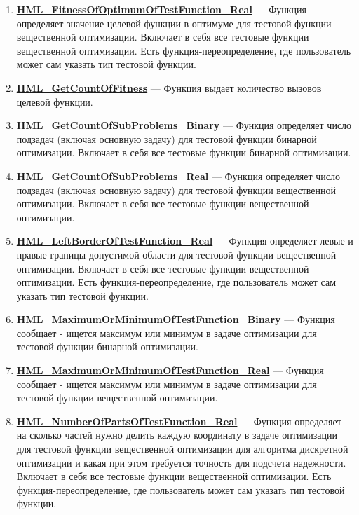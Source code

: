 \documentclass[a4paper,12pt]{article}
\begin{document}
\begin{enumerate}
\item \textbf{\hyperref[HML_FitnessOfOptimumOfTestFunction_Real]{HML\_FitnessOfOptimumOfTestFunction\_Real}} --- Функция определяет значение целевой функции в оптимуме для тестовой функции вещественной оптимизации. Включает в себя все тестовые функции вещественной оптимизации. Есть функция-переопределение, где пользователь может сам указать тип тестовой функции.

\item \textbf{\hyperref[HML_GetCountOfFitness]{HML\_GetCountOfFitness}} --- Функция выдает количество вызовов целевой функции.

\item \textbf{\hyperref[HML_GetCountOfSubProblems_Binary]{HML\_GetCountOfSubProblems\_Binary}} --- Функция определяет число подзадач (включая основную задачу) для тестовой функции бинарной оптимизации. Включает в себя все тестовые функции бинарной оптимизации.

\item \textbf{\hyperref[HML_GetCountOfSubProblems_Real]{HML\_GetCountOfSubProblems\_Real}} --- Функция определяет число подзадач (включая основную задачу) для тестовой функции вещественной оптимизации. Включает в себя все тестовые функции вещественной оптимизации.

\item \textbf{\hyperref[HML_LeftBorderOfTestFunction_Real]{HML\_LeftBorderOfTestFunction\_Real}} --- Функция определяет левые и правые границы допустимой области для тестовой функции вещественной оптимизации. Включает в себя все тестовые функции вещественной оптимизации. Есть функция-переопределение, где пользователь может сам указать тип тестовой функции.

\item \textbf{\hyperref[HML_MaximumOrMinimumOfTestFunction_Binary]{HML\_MaximumOrMinimumOfTestFunction\_Binary}} --- 	Функция сообщает - ищется максимум или минимум в задаче оптимизации для тестовой функции бинарной оптимизации.

\item \textbf{\hyperref[HML_MaximumOrMinimumOfTestFunction_Real]{HML\_MaximumOrMinimumOfTestFunction\_Real}} --- 	Функция сообщает - ищется максимум или минимум в задаче оптимизации для тестовой функции вещественной оптимизации.

\item \textbf{\hyperref[HML_NumberOfPartsOfTestFunction_Real]{HML\_NumberOfPartsOfTestFunction\_Real}} --- Функция определяет на сколько частей нужно делить каждую координату в задаче оптимизации для тестовой функции вещественной оптимизации для алгоритма дискретной оптимизации и какая при этом требуется точность для подсчета надежности. Включает в себя все тестовые функции вещественной оптимизации. Есть функция-переопределение, где пользователь может сам указать тип тестовой функции.


\end{enumerate}
\end{document}
